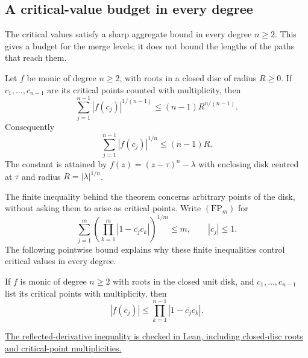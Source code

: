 \subsection*{A critical-value budget in every degree}

The critical values satisfy a sharp aggregate bound in every degree $n\ge2$.  This gives a budget for the merge levels; it does not
bound the lengths of the paths that reach them.

\begin{theorem}
\label{res:critical-value-budget}
Let $f$ be monic of degree $n\ge2$, with roots in a closed disc of radius
$R\ge0$.  If $c_1,\ldots,c_{n-1}$ are its critical points counted with
multiplicity, then
\begin{equation}\label{eq:critical-value-power-budget}
 \sum_{j=1}^{n-1}|f(c_j)|^{1/(n-1)}\le(n-1)R^{n/(n-1)}.
\end{equation}
Consequently
\[
 \sum_{j=1}^{n-1}|f(c_j)|^{1/n}\le(n-1)R.
\]
The constant is attained by $f(z)=(z-\tau)^n-\lambda$ with enclosing
disk centred at $\tau$ and radius $R=|\lambda|^{1/n}$.
\end{theorem}

The finite inequality behind the theorem concerns arbitrary points of the
disk, without asking them to arise as critical points.  Write $(\mathrm{FP}_m)$
for
\[
 \sum_{j=1}^m\left(\prod_{k=1}^m
       |1-\overline{c_j}c_k|\right)^{1/m}\le m,
 \qquad |c_j|\le1.
\]
The following pointwise bound explains why these finite inequalities
control critical values in every degree.

\begin{lemma}\label{res:reflected-critical-value}
If $f$ is monic of degree $n\ge2$ with roots in the closed unit disk,
and $c_1,\ldots,c_{n-1}$ list its critical points with multiplicity, then
\begin{equation}\label{eq:critical-reflected-product}
 |f(c_j)|\le\prod_{k=1}^{n-1}|1-\overline{c_j}c_k|.
\end{equation}
\end{lemma}

\noindent\href{https://github.com/wcook04/plectis-erdos/blob/bb4e24651b37cd096d3749ef299c3317930b3a3b/ErdosProblems/Erdos1041/PaperReflectedCompletion.lean#L254}{The reflected-derivative inequality is checked in Lean, including closed-disc roots and critical-point multiplicities.}

